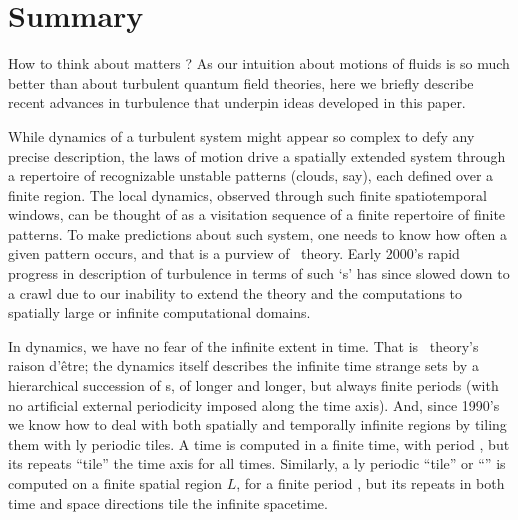 

\section{Summary}
\label{s:summary}


How to think about matters {\spt}? As our intuition about motions of
fluids is so much better than about turbulent quantum field theories,
here we briefly describe recent advances in turbulence that underpin
ideas developed in this paper.

While dynamics of a turbulent system might appear so complex to defy any
precise description, the laws of motion drive a spatially extended system
through a repertoire of recognizable unstable patterns (clouds, say),
each defined over a finite  {\spt} region.
The local dynamics, observed through such finite spatiotemporal windows,
can be thought of as a visitation sequence of a finite repertoire of
finite patterns.
To make predictions about such system,  one needs to know how often a
given pattern  occurs, and that is a purview of \po\ theory.
Early 2000's rapid progress in description of turbulence in terms of such
`{\ecs}s' has since slowed down to a crawl
due to our inability to extend the theory and the computations to
spatially large or infinite computational domains.

In dynamics, we have no fear of the infinite extent in time. That is \po\
theory's raison d'\^{e}tre; the dynamics itself describes the
infinite time strange sets by a hierarchical succession of \po s, of
longer and longer, but always finite periods (with no artificial external
periodicity imposed along the time axis). And, since 1990's we know how
to deal with both spatially and temporally infinite regions by tiling
them with {\spt}ly periodic tiles\rf{Christiansen97,FE03,GHCW07}. A time
{\po} is computed in a finite time, with period \period{}, but its
repeats ``tile'' the time axis for all times. Similarly, a {\spt}ly
periodic ``tile'' or ``\twot'' is computed on a finite spatial region
$L$, for a finite period \period{}, but its repeats in both time and
space directions tile the infinite spacetime.

